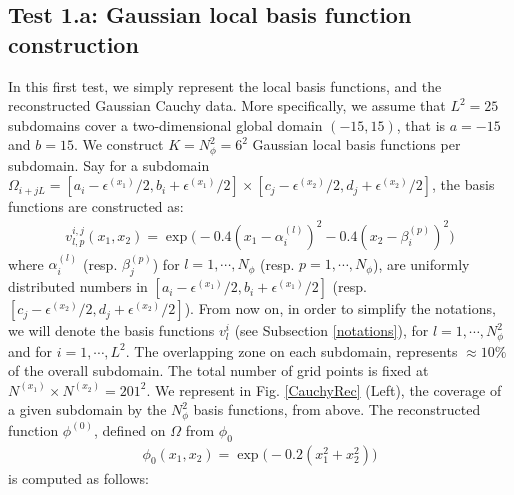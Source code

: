 \subsection{Test 1.a: Gaussian local basis function construction}\label{testA}
In this first test, we simply represent the local basis functions, and the reconstructed Gaussian Cauchy data. More specifically, we assume that $L^2=25$ subdomains cover a two-dimensional global domain $(-15,15)$, that is $a=-15$ and $b=15$. We construct  $K=N_{\phi}^2=6^2$ Gaussian local basis functions per subdomain. Say for a subdomain $\Omega_{i+jL}=[a_i-\epsilon^{(x_1)}/2,b_i+\epsilon^{(x_1)}/2]\times[c_j-\epsilon^{(x_2)}/2,d_j+\epsilon^{(x_2)}/2]$, the basis functions are constructed as:
\begin{eqnarray*}
v_{l,p}^{i,j}(x_1,x_2) = \exp\big(-0.4(x_1-\alpha^{(l)}_i)^2-0.4(x_2-\beta^{(p)}_i)^2\big)
\end{eqnarray*}
where $\alpha^{(l)}_i$ (resp. $\beta^{(p)}_j$) for $l=1,\cdots,N_{\phi}$ (resp. $p=1,\cdots,N_{\phi}$), are uniformly distributed numbers in $[a_i-\epsilon^{(x_1)}/2,b_i+\epsilon^{(x_1)}/2]$ (resp. $[c_j-\epsilon^{(x_2)}/2,d_j+\epsilon^{(x_2)}/2]$).  From now on, in order to simplify the notations, we will denote the basis functions $v^{i}_l$ (see Subsection \ref{notations}), for $l=1,\cdots,N_{\phi}^2$ and for $i=1,\cdots,L^2$.  The overlapping zone on each subdomain, represents $\approx 10\%$ of the overall subdomain. The total number of grid points is fixed at $N^{(x_1)}\times N^{(x_2)}=201^2$. We represent in Fig. \ref{CauchyRec} (Left), the coverage of a given subdomain by the $N_{\phi}^2$ basis functions, from above.  The reconstructed function $\phi^{(0)}$, defined on $\Omega$ from $\phi_0$
\begin{eqnarray*}
\phi_0(x_1,x_2) = \exp\big(-0.2(x_1^2+x_2^2)\big)
\end{eqnarray*}
is computed as follows:
